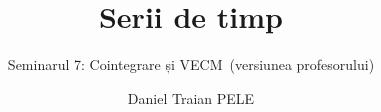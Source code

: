 \title[Serii de timp]{Serii de timp}
\subtitle{Seminarul 7: Cointegrare și VECM\ifsolutions\ (versiunea profesorului)\fi}
\author[D.T. Pele]{Daniel Traian PELE}
\date{}

\providecommand{\tsaapplink}[3]{\hypertarget{#2}{}\hyperlink{#1}{\beamergotobutton{#3}}}  %
\providecommand{\tsaappback}[2]{\begin{tikzpicture}[remember picture,overlay]\node[anchor=south east] at ([xshift=-3mm,yshift=7mm]current page.south east){\hyperlink{#1}{\beamerreturnbutton{#2}}};\end{tikzpicture}}  %
\providecommand{\tsachlink}[2]{\href{#1}{#2}}  %
\providecommand{\tsachlinkt}[2]{\href{#1}{\usebeamercolor[fg]{frametitle}#2}}  %


